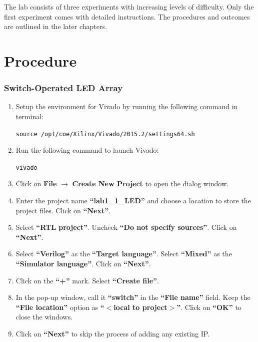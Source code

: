 \documentclass[11pt,letterpaper,titlepage]{article}
\begin{document}
The lab consists of three experiments with increasing levels of difficulty. Only the first experiment comes with detailed instructions. The procedures and outcomes are outlined in the later chapters.

\part{Procedure}

\section{Switch-Operated LED Array}

\begin{enumerate}
    \item Setup the environment for Vivado by running the following command in terminal:
    
    \verb|source /opt/coe/Xilinx/Vivado/2015.2/settings64.sh|
    
    \item Run the following command to launch Vivado:
    
    \verb|vivado|
    
    \item Click on \textbf{File} $\rightarrow$ \textbf{Create New Project} to open the dialog window.
    
    \item Enter the project name \textbf{``lab1\_1\_LED''} and choose a location to store the project files. Click on \textbf{``Next''}.
    
    \item Select \textbf{``RTL project''}. Uncheck \textbf{``Do not specify sources''}. Click on \textbf{``Next''}.
    
    \item Select \textbf{``Verilog''} as the \textbf{``Target language''}. Select \textbf{``Mixed''} as the \textbf{``Simulator language''}. Click on \textbf{``Next''}.
    
    \item Click on the \textbf{``+''} mark. Select \textbf{``Create file''}.
    
    \item In the pop-up window, call it \textbf{``switch''} in the \textbf{``File name''} field. Keep the \textbf{``File location''} option as \textbf{``$<$local to project$>$''}. Click on \textbf{``OK''} to close the windows.
    
    \item Click on \textbf{``Next''} to skip the process of adding any existing IP.
    

\end{enumerate}
\end{document}
